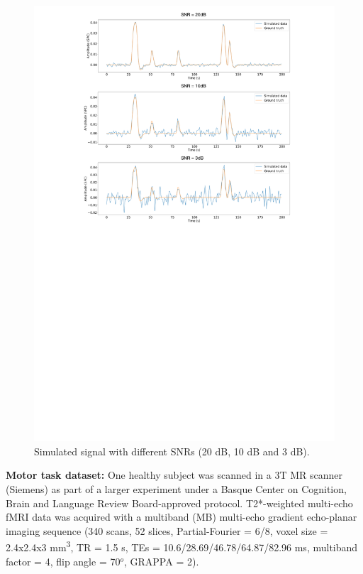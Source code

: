 \begin{figure}[h]
    \begin{center}
        \includegraphics[width=\columnwidth]{figures/sim.pdf}
    \end{center}
    \caption{Simulated signal with different SNRs (20 dB, 10 dB and 3 dB).}
\label{fig:simulations}
\end{figure}

\textbf{Motor task dataset:} One healthy subject was scanned in a 3T MR scanner (Siemens) as part of a larger experiment under a Basque Center on Cognition, Brain and Language Review Board-approved protocol. T2*-weighted multi-echo fMRI data was acquired with a multiband (MB) multi-echo gradient echo-planar imaging sequence (340 scans, 52 slices, Partial-Fourier = 6/8, voxel size = 2.4x2.4x3 mm\textsuperscript{3}, TR = 1.5 s, TEs = 10.6/28.69/46.78/64.87/82.96 ms, multiband factor = 4, flip angle = 70\(^o\), GRAPPA = 2).


